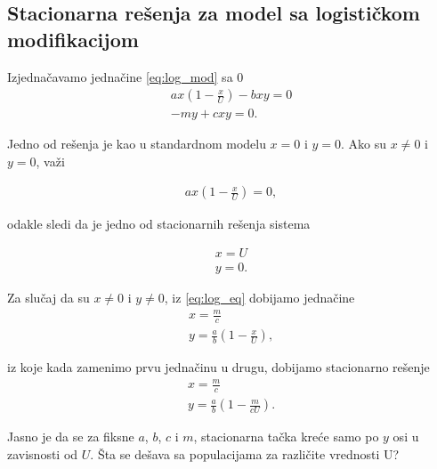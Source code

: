\documentclass[a4paper]{article}
\begin{document}
\subsection{Stacionarna rešenja za model sa logističkom modifikacijom}

Izjednačavamo jednačine \eqref{eq:log_mod} sa 0
\begin{equation}
    \label{eq:log_eq}
    \begin{aligned}
        ax(1 - \frac{x}{U}) - bxy = 0\\
        -my + cxy = 0.
    \end{aligned}
\end{equation}

Jedno od rešenja je kao u standardnom modelu $x=0$ i $y=0$.
Ako su $x\neq0$ i $y=0$, važi

\begin{displaymath}
    \begin{aligned}
        ax(1 - \frac{x}{U}) = 0,
    \end{aligned}
\end{displaymath}

odakle sledi da je jedno od stacionarnih rešenja sistema

\begin{displaymath}
    \begin{aligned}
        x=U\\
        y=0.
    \end{aligned}
\end{displaymath}

Za slučaj da su $x\neq0$ i $y\neq0$, iz \eqref{eq:log_eq} dobijamo jednačine
\begin{displaymath}
    \label{eq:log_stac}
    \begin{aligned}
        x = \frac{m}{c}\\
        y = \frac{a}{b}(1 - \frac{x}{U}),
    \end{aligned}
\end{displaymath}

iz koje kada zamenimo prvu jednačinu u drugu, dobijamo
stacionarno rešenje
\begin{equation}
    \label{eq:log_stac}
    \begin{aligned}
        x = \frac{m}{c}\\
        y = \frac{a}{b}(1 - \frac{m}{cU}).
    \end{aligned}
\end{equation}

Jasno je da se za fiksne $a$, $b$, $c$ i $m$,
stacionarna tačka kreće samo po $y$ osi u zavisnosti od $U$.
Šta se dešava sa populacijama za različite vrednosti
U?
\end{document}
